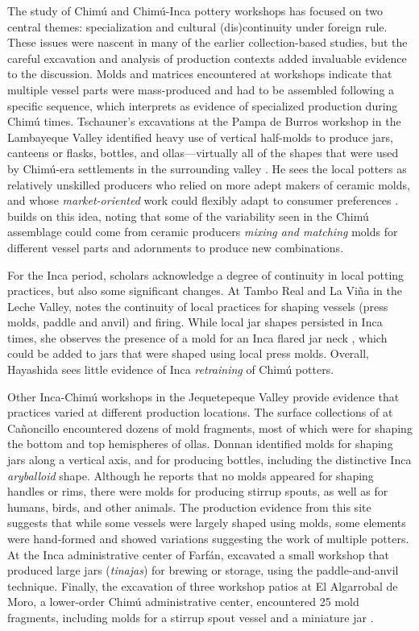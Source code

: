 \documentclass[]{interact}
\theoremstyle{plain}%
\theoremstyle{definition}
\theoremstyle{remark}
\begin{document}
The study of Chimú and Chimú-Inca pottery workshops has focused on two
central themes: specialization and cultural (dis)continuity under
foreign rule. These issues were nascent in many of the earlier
collection-based studies, but the careful excavation and analysis of
production contexts added invaluable evidence to the discussion. Molds
and matrices encountered at workshops indicate that multiple vessel
parts were mass-produced and had to be assembled following a specific
sequence, which \citet[179]{RN11168} interprets as evidence of
specialized production during Chimú times. Tschauner's excavations at
the Pampa de Burros workshop in the Lambayeque Valley identified heavy
use of vertical half-molds to produce jars, canteens or flasks, bottles,
and ollas---virtually all of the shapes that were used by Chimú-era
settlements in the surrounding valley \citep[182]{RN11168}. He sees the
local potters as relatively unskilled producers who relied on more adept
makers of ceramic molds, and whose \emph{market-oriented} work could
flexibly adapt to consumer preferences \citep[183-185]{RN11168}.
\citet{RN11170} builds on this idea, noting that some of the variability
seen in the Chimú assemblage could come from ceramic producers
\emph{mixing and matching} molds for different vessel parts and
adornments to produce new combinations.

For the Inca period, scholars acknowledge a degree of continuity in
local potting practices, but also some significant changes. At Tambo
Real and La Viña in the Leche Valley, \citet{RN8875} notes the
continuity of local practices for shaping vessels (press molds, paddle
and anvil) and firing. While local jar shapes persisted in Inca times,
she observes the presence of a mold for an Inca flared jar neck
\citep[345]{RN8875}, which could be added to jars that were shaped using
local press molds. Overall, Hayashida sees little evidence of Inca
\emph{retraining} of Chimú potters.

Other Inca-Chimú workshops in the Jequetepeque Valley provide evidence
that practices varied at different production locations. The surface
collections of \citet[32-35]{RN11164} at Cañoncillo encountered dozens
of mold fragments, most of which were for shaping the bottom and top
hemispheres of ollas. Donnan identified molds for shaping jars along a
vertical axis, and for producing bottles, including the distinctive Inca
\emph{aryballoid} shape. Although he reports that no molds appeared for
shaping handles or rims, there were molds for producing stirrup spouts,
as well as for humans, birds, and other animals. The production evidence
from this site suggests that while some vessels were largely shaped
using molds, some elements were hand-formed and showed variations
suggesting the work of multiple potters. At the Inca administrative
center of Farfán, \citet[336-338]{RN11166} excavated a small workshop
that produced large jars (\emph{tinajas}) for brewing or storage, using
the paddle-and-anvil technique. Finally, the excavation of three
workshop patios at El Algarrobal de Moro, a lower-order Chimú
administrative center, encountered 25 mold fragments, including molds
for a stirrup spout vessel and a miniature jar \citep[21-22]{RN11167}.
\end{document}
